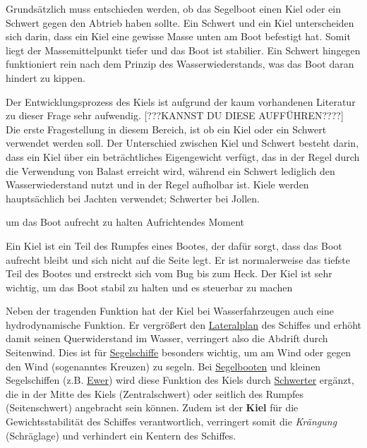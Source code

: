Grundsätzlich muss entschieden werden, ob das Segelboot einen Kiel oder ein Schwert gegen den Abtrieb haben sollte. Ein Schwert und ein Kiel unterscheiden sich darin, dass ein Kiel eine gewisse Masse unten am Boot befestigt hat. Somit liegt der Massemittelpunkt tiefer und das Boot ist stabilier.
Ein Schwert hingegen funktioniert rein nach dem Prinzip des Wasserwiederstands, was das Boot daran hindert zu kippen.

 
Der Entwicklungsprozess des Kiels ist aufgrund der kaum vorhandenen Literatur zu dieser Frage sehr aufwendig. [???KANNST DU DIESE AUFFÜHREN????]\\ 

Die erste Fragestellung in diesem Bereich, ist ob ein Kiel oder ein Schwert verwendet werden soll. Der Unterschied zwischen Kiel und Schwert besteht darin, dass ein Kiel über ein beträchtliches Eigengewicht verfügt, das in der Regel durch die Verwendung von Balast  erreicht wird, während  ein Schwert lediglich den Wasserwiederstand nutzt und in der Regel aufholbar ist. Kiele werden hauptsächlich bei Jachten verwendet; Schwerter bei Jollen. 

 um das Boot aufrecht zu halten
Aufrichtendes Moment


Ein Kiel ist ein Teil des Rumpfes eines Bootes, der dafür sorgt, dass das Boot aufrecht bleibt und sich nicht auf die Seite legt. Er ist normalerweise das tiefste Teil des Bootes und erstreckt sich vom Bug bis zum Heck. Der Kiel ist sehr wichtig, um das Boot stabil zu halten und es steuerbar zu machen 

Neben der tragenden Funktion hat der Kiel bei Wasserfahrzeugen auch eine hydrodynamische Funktion. Er vergrößert den \href{http://en.wikipedia.org/wiki/de:Lateralplan}{Lateralplan} des Schiffes und erhöht damit seinen Querwiderstand im Wasser, verringert also die Abdrift durch Seitenwind. Dies ist für \href{https://www.modellbau-wiki.de/wiki/Segel}{Segelschiffe} besonders wichtig, um am Wind oder gegen den Wind (sogenanntes Kreuzen) zu segeln. Bei \href{https://www.modellbau-wiki.de/wiki/Segel}{Segelbooten} und kleinen Segelschiffen (z.B. \href{http://en.wikipedia.org/wiki/de:Ewer}{Ewer}) wird diese Funktion des Kiels durch \href{https://www.modellbau-wiki.de/wiki/Schwert_(Schiffbau)}{Schwerter} ergänzt, die in der Mitte des Kiels (Zentralschwert) oder seitlich des Rumpfes (Seitenschwert) angebracht sein können. Zudem ist der \textbf{Kiel} für die Gewichtsstabilität des Schiffes verantwortlich, verringert somit die \textit{Krängung} (Schräglage) und verhindert ein Kentern des Schiffes.  

